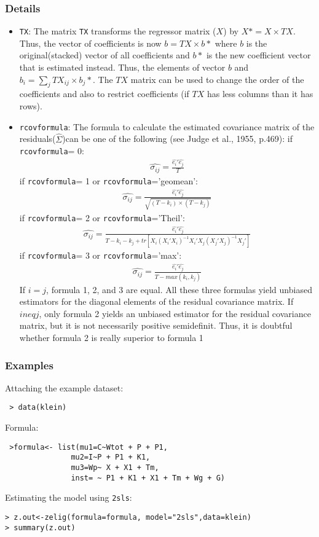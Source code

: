 \subsubsection{Details}
\label{details}
\begin{itemize}
\item \texttt{TX}: The matrix \texttt{TX} transforms the regressor matrix 
($X$) by $X\ast=X \times TX$. Thus,
the vector of coefficients is now $b=TX \times b\ast$ where $b$ is the 
original(stacked) 
vector of all coefficients and $b\ast$ is the new coefficient vector 
that is estimated instead.
Thus, the elements of vector $b$ and $b_i = \sum_j TX_{ij}\times b_j\ast$. The $TX$ matrix can be
used to change the order of the coefficients and also to restrict coefficients (if $TX$ has 
less columns than it has rows).
\item \texttt{rcovformula}: The formula to calculate the estimated covariance matrix of the residuals($\hat{\Sigma}$)can be one
of the following (see Judge et al., 1955, p.469):
if \texttt{rcovformula}= 0:
\begin{eqnarray*}
\hat{\sigma_{ij}}= \frac{\hat{e_i}\prime\hat{e_j}}{T}
\end{eqnarray*}
if \texttt{rcovformula}= 1 or \texttt{rcovformula}='geomean':
\begin{eqnarray*}
\hat{\sigma_{ij}}= \frac{\hat{e_i}\prime\hat{e_j}}{\sqrt{(T-k_i)\times (T-k_j)}}
\end{eqnarray*}
if \texttt{rcovformula}= 2 or \texttt{rcovformula}='Theil':
\begin{eqnarray*}
\hat{\sigma_{ij}}= \frac{\hat{e_i}\prime\hat{e_j}}{T-k_i-k_j+tr[X_i(X_i\prime X_i)^{-1}X_i\prime X_j(X_j\prime X_j)^{-1}X_j\prime]}
\end{eqnarray*}
if \texttt{rcovformula}= 3 or \texttt{rcovformula}='max':
\begin{eqnarray*}
\hat{\sigma_{ij}}= \frac{\hat{e_i}\prime\hat{e_j}}{T-max(k_i,k_j)}
\end{eqnarray*}
If $i = j$, formula 1, 2, and 3 are equal. All these three formulas yield unbiased estimators
for the diagonal elements of the residual covariance matrix. If $i neq j$, only formula 2
yields an unbiased estimator for the residual covariance matrix, but it is not necessarily
positive semidefinit. Thus, it is doubtful whether formula 2 is really superior to formula 1
\end{itemize}
\subsubsection{Examples}
 Attaching the example dataset:
 \begin{verbatim} 
 > data(klein)
 \end{verbatim}
 Formula:
\begin{verbatim}
 >formula<- list(mu1=C~Wtot + P + P1,
               mu2=I~P + P1 + K1,
               mu3=Wp~ X + X1 + Tm,
               inst= ~ P1 + K1 + X1 + Tm + Wg + G)
\end{verbatim}
Estimating the model using \texttt{2sls}:
\begin{verbatim}
> z.out<-zelig(formula=formula, model="2sls",data=klein)
> summary(z.out)
\end{verbatim}

